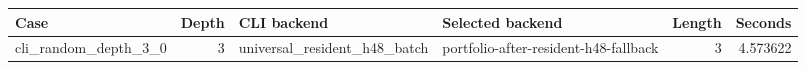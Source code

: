 {\small
\begin{tabular}{lrllrr}
\hline
Case & Depth & CLI backend & Selected backend & Length & Seconds \\
\hline
cli\_random\_depth\_3\_0 & 3 & universal\_resident\_h48\_batch & portfolio-after-resident-h48-fallback & 3 & 4.573622 \\
\hline
\end{tabular}
}
